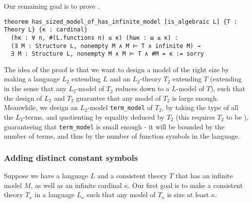 Our remaining goal is to prove
.

\begin{lstlisting}
theorem has_sized_model_of_has_infinite_model [is_algebraic L] {T : Theory L} {κ : cardinal}
  (hκ : ∀ n, #(L.functions n) ≤ κ) (hωκ : ω ≤ κ) :
  (∃ M : Structure L, nonempty M ∧ M ⊨ T ∧ infinite M) →
  ∃ M : Structure L, nonempty M ∧ M ⊨ T ∧ #M = κ := sorry \end{lstlisting}

The idea of the proof is that we want to design a model of the right size
by making a language $L_{2}$ extending $L$ and an $L_{2}$-theory $T_{2}$ extending $T$
(extending in the sense that any $L_{2}$-model of $T_{2}$ reduces down to a $L$-model of $T$),
such that the design of $L_{2}$ and $T_{2}$ guarantee that any model of $T_{2}$ is large enough.
Meanwhile, we design an $L_{2}$-model \texttt{term\_model} of $T_{2}$,
by taking the type of all the $L_{2}$-terms,
and quotienting by equality deduced by $T_{2}$ (this requires $T_{2}$ to be ),
guaranteeing that \texttt{term\_model} is small enough
- it will be bounded by the number of terms,
and thus by the number of function symbols in the language.

\subsubsection{Adding distinct constant symbols}

Suppose we have a language $L$ and a consistent theory $T$ that has
an infinite model $M$, as well as an infinite cardinal $\kappa$.
Our first goal is to make a consistent theory $T_\kappa$
in a language $L_{\kappa}$ such that any model of $T_{\kappa}$
is size at least $\kappa$.

